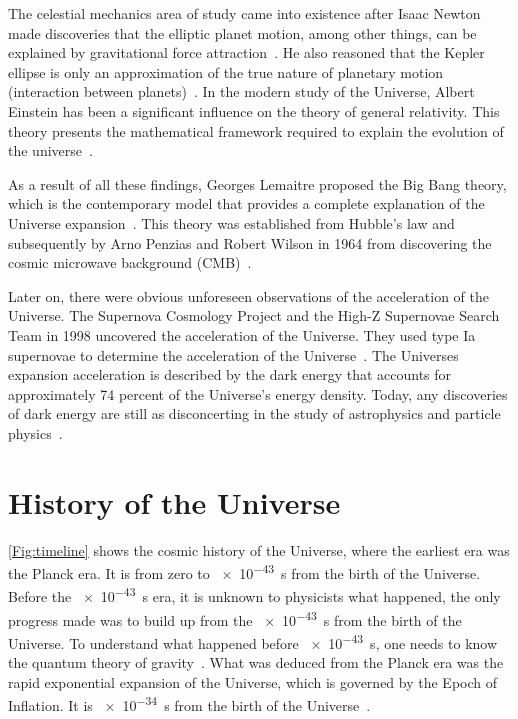 \documentclass[12pt,a4paper]{report}
\begin{document}
	The celestial mechanics area of study came into existence after Isaac Newton made discoveries that the elliptic planet motion, among other things, can be explained by gravitational force attraction~\citep{2015arXiv150201967R}. He also reasoned that the Kepler ellipse is only an approximation of the true nature of planetary motion (interaction between planets)~\citep{2015arXiv150201967R,2015arXiv150704654N}. In the modern study of the Universe, Albert Einstein has been a significant influence on the theory of general relativity. This theory presents the mathematical framework required to explain the evolution of the universe~\citep{2018EPJH...43...73O}.
		
	As a result of all these findings, Georges Lemaitre proposed the Big Bang theory, which is the contemporary model that provides a complete explanation of the Universe expansion~\citep{2020AntAs..14....2M}. This theory was established from Hubble’s law and subsequently by Arno Penzias and Robert Wilson in 1964 from discovering the cosmic microwave background (CMB)~\citep{2018EPJH...43...73O,2003RvMP...75..559P,1929PNAS...15..168H}.
		
	Later on, there were obvious unforeseen observations of the acceleration of the Universe. The Supernova Cosmology Project and the High-Z Supernovae Search Team in 1998 uncovered the acceleration of the Universe. They used type Ia supernovae to determine the acceleration of the Universe~\citep{1998AJ....116.1009R, 1999ApJ...517..565P}. The Universes expansion acceleration is described by the dark energy that accounts for approximately 74 percent of the Universe’s energy density. Today, any discoveries of dark energy are still as disconcerting in the study of astrophysics and particle physics~\citep{2008ARA&A..46..385F, 2015Sci...349..849H}.\\
		
	\section{History of the Universe}
	

	\autoref{Fig:timeline} shows the cosmic history of the Universe, where the earliest era was the Planck era. It is from zero to \SI{e-43}{s} from the birth of the Universe. Before the \SI{e-43}{s} era, it is unknown to physicists what happened, the only progress made was to build up from the \SI{e-43}{s} from the birth of the Universe. To understand what happened before \SI{e-43}{s}, one needs to know the quantum theory of gravity~\citep{2015Sci...349..849H}. What was deduced from the Planck era was the rapid exponential expansion of the Universe, which is governed by the Epoch of Inflation. It is \SI{e-34}{s} from the birth of the Universe~\citep{Planck}.
	
\end{document}
